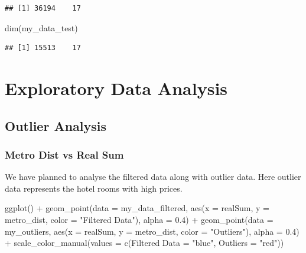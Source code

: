 \documentclass[
]{article}
\newenvironment{Shaded}{\begin{snugshade}}{\end{snugshade}}
\newcommand{\AttributeTok}[1]{\textcolor[rgb]{0.77,0.63,0.00}{#1}}
\newcommand{\FloatTok}[1]{\textcolor[rgb]{0.00,0.00,0.81}{#1}}
\newcommand{\FunctionTok}[1]{\textcolor[rgb]{0.00,0.00,0.00}{#1}}
\newcommand{\NormalTok}[1]{#1}
\newcommand{\OtherTok}[1]{\textcolor[rgb]{0.56,0.35,0.01}{#1}}
\newcommand{\SpecialCharTok}[1]{\textcolor[rgb]{0.00,0.00,0.00}{#1}}
\newcommand{\StringTok}[1]{\textcolor[rgb]{0.31,0.60,0.02}{#1}}
\begin{document}
\begin{verbatim}
## [1] 36194    17
\end{verbatim}

\begin{Shaded}
\begin{Highlighting}[]
\FunctionTok{dim}\NormalTok{(my\_data\_test)}
\end{Highlighting}
\end{Shaded}

\begin{verbatim}
## [1] 15513    17
\end{verbatim}

\hypertarget{exploratory-data-analysis-1}{%
\section{Exploratory Data Analysis}\label{exploratory-data-analysis-1}}

\hypertarget{outlier-analysis}{%
\subsection{Outlier Analysis}\label{outlier-analysis}}

\hypertarget{metro-dist-vs-real-sum}{%
\subsubsection{Metro Dist vs Real Sum}\label{metro-dist-vs-real-sum}}

We have planned to analyse the filtered data along with outlier data.
Here outlier data represents the hotel rooms with high prices.

\begin{Shaded}
\begin{Highlighting}[]
\FunctionTok{ggplot}\NormalTok{() }\SpecialCharTok{+} \FunctionTok{geom\_point}\NormalTok{(}\AttributeTok{data =}\NormalTok{ my\_data\_filtered, }\FunctionTok{aes}\NormalTok{(}\AttributeTok{x =}\NormalTok{ realSum,}
    \AttributeTok{y =}\NormalTok{ metro\_dist, }\AttributeTok{color =} \StringTok{"Filtered Data"}\NormalTok{), }\AttributeTok{alpha =} \FloatTok{0.4}\NormalTok{) }\SpecialCharTok{+}
    \FunctionTok{geom\_point}\NormalTok{(}\AttributeTok{data =}\NormalTok{ my\_outliers, }\FunctionTok{aes}\NormalTok{(}\AttributeTok{x =}\NormalTok{ realSum, }\AttributeTok{y =}\NormalTok{ metro\_dist,}
        \AttributeTok{color =} \StringTok{"Outliers"}\NormalTok{), }\AttributeTok{alpha =} \FloatTok{0.4}\NormalTok{) }\SpecialCharTok{+} \FunctionTok{scale\_color\_manual}\NormalTok{(}\AttributeTok{values =} \FunctionTok{c}\NormalTok{(}\StringTok{\textasciigrave{}}\AttributeTok{Filtered Data}\StringTok{\textasciigrave{}} \OtherTok{=} \StringTok{"blue"}\NormalTok{,}
    \AttributeTok{Outliers =} \StringTok{"red"}\NormalTok{))}
\end{Highlighting}
\end{Shaded}
\end{document}

